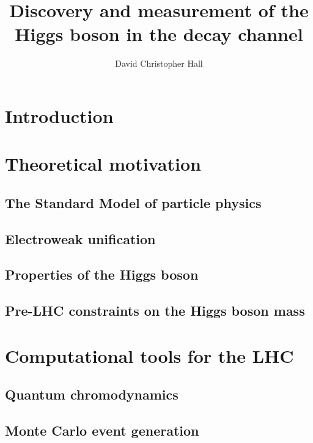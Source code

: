 \documentclass[hyper,linkcolor=blue]{mythesis}
\title{Discovery and measurement of the Higgs boson in the \WW decay channel}
\author{David Christopher Hall}
\begin{document}
\begin{frontmatter}
  
\end{frontmatter}

\begin{mainmatter}
  \listoftodos
  
  
  \chapter*{Introduction}
    \label{chap:intro}
    

  \chapter{Theoretical motivation}
    \label{chap:motivation}
    
    \section{The Standard Model of particle physics}
      \label{sec:sm}
      
    \section{Electroweak unification}
      \label{sec:ewsb}
      
    \section{Properties of the Higgs boson}
      \label{sec:properties}
      
    \section{Pre-LHC constraints on the Higgs boson mass}
      \label{sec:prior_constraints}
      

  \chapter{Computational tools for the LHC}
    \label{chap:tools}
    
    \section{Quantum chromodynamics}
      \label{sec:qcd}
      
    \section{Monte Carlo event generation}
      \label{sec:mc}
      

\end{mainmatter}
\end{document}
